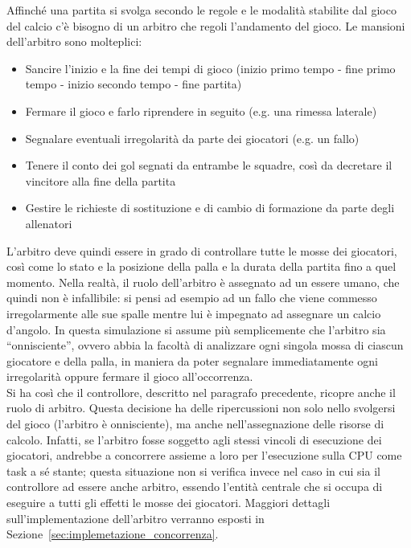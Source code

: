 Affinché una partita si svolga secondo le regole e le modalità stabilite dal gioco del calcio c'è bisogno di un arbitro che regoli l'andamento del gioco. Le mansioni dell'arbitro sono molteplici:

\begin{itemize}
	\item Sancire l'inizio e la fine dei tempi di gioco (inizio primo tempo - fine primo tempo - inizio secondo tempo - fine partita)
	\item Fermare il gioco e farlo riprendere in seguito (e.g. una rimessa laterale)
	\item Segnalare eventuali irregolarità da parte dei giocatori (e.g. un fallo)
	\item Tenere il conto dei gol segnati da entrambe le squadre, così da decretare il vincitore alla fine della partita
	\item Gestire le richieste di sostituzione e di cambio di formazione da parte degli allenatori
\end{itemize}

L'arbitro deve quindi essere in grado di controllare tutte le mosse dei giocatori, così come lo stato e la posizione della palla e la durata della partita fino a quel momento. Nella realtà, il ruolo dell'arbitro è assegnato ad un essere umano, che quindi non è infallibile: si pensi ad esempio ad un fallo che viene commesso irregolarmente alle sue spalle mentre lui è impegnato ad assegnare un calcio d'angolo. In questa simulazione si assume più semplicemente che l'arbitro sia ``onnisciente'', ovvero abbia la facoltà di analizzare ogni singola mossa di ciascun giocatore e della palla, in maniera da poter segnalare immediatamente ogni irregolarità oppure fermare il gioco all'occorrenza.\\

Si ha così che il controllore, descritto nel paragrafo precedente, ricopre anche il ruolo di arbitro. Questa decisione ha delle ripercussioni non solo nello svolgersi del gioco (l'arbitro è onnisciente), ma anche nell'assegnazione delle risorse di calcolo. Infatti, se l'arbitro fosse soggetto agli stessi vincoli di esecuzione dei giocatori, andrebbe a concorrere assieme a loro per l'esecuzione sulla CPU come task a sé stante; questa situazione non si verifica invece nel caso in cui sia il controllore ad essere anche arbitro, essendo l'entità centrale che si occupa di eseguire a tutti gli effetti le mosse dei giocatori. Maggiori dettagli sull'implementazione dell'arbitro verranno esposti in Sezione~\ref{sec:implemetazione_concorrenza}.\\


